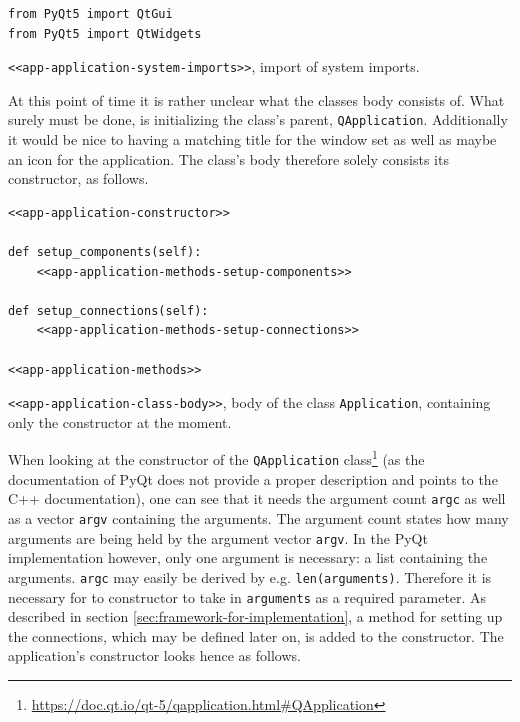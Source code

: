 \documentclass[10pt, openright, notitlepage]{scrreprt}
\begin{document}
\begin{enumerate}
\begin{listing}[H]
\begin{verbatim}
from PyQt5 import QtGui
from PyQt5 import QtWidgets
\end{verbatim}
\caption{\label{app-application-system-imports}
\texttt{<<app-application-system-imports>>}, import of system imports.}
\end{listing}

At this point of time it is rather unclear what the classes body consists of.
What surely must be done, is initializing the class's parent, \texttt{QApplication}.
Additionally it would be nice to having a matching title for the window set as
well as maybe an icon for the application. The class's body therefore solely
consists its constructor, as follows.

\begin{listing}[H]
\begin{verbatim}
<<app-application-constructor>>

def setup_components(self):
    <<app-application-methods-setup-components>>

def setup_connections(self):
    <<app-application-methods-setup-connections>>

<<app-application-methods>>
\end{verbatim}
\caption{\label{app-application-class-body}
\texttt{<<app-application-class-body>>}, body of the class \texttt{Application}, containing only the constructor at the moment.}
\end{listing}

When looking at the constructor of the \texttt{QApplication}
class\footnote{\url{https://doc.qt.io/qt-5/qapplication.html\#QApplication}} (as the
documentation of PyQt does not provide a proper description and points to the
C++ documentation), one can see that it needs the argument count \texttt{argc} as well
as a vector \texttt{argv} containing the arguments. The argument count states how many
arguments are being held by the argument vector \texttt{argv}. In the PyQt
implementation however, only one argument is necessary: a list containing the
arguments. \texttt{argc} may easily be derived by e.g. \texttt{len(arguments)}. Therefore it
is necessary for to constructor to take in \texttt{arguments} as a required parameter.
As described in section \ref{sec:framework-for-implementation}, a method for setting up
the connections, which may be defined later on, is added to the constructor. The
application's constructor looks hence as follows.


\end{enumerate}
\end{document}
